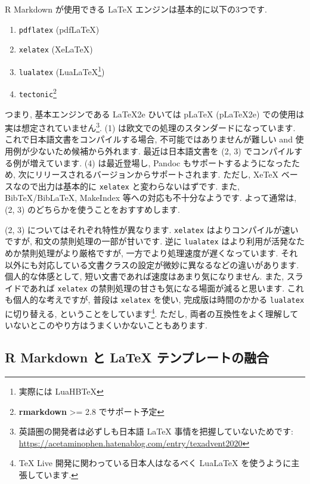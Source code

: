 \documentclass[
]{ltjsarticle}
\providecommand{\tightlist}{%
  \setlength{\itemsep}{0pt}\setlength{\parskip}{0pt}}
\begin{document}
R Markdown が使用できる LaTeX エンジンは基本的に以下の3つです.

\begin{enumerate}
\def\labelenumi{\arabic{enumi}.}
\tightlist
\item
  \texttt{pdflatex} (pdfLaTeX)
\item
  \texttt{xelatex} (XeLaTeX)
\item
  \texttt{lualatex} (LuaLaTeX\footnote{実際には LuaHBTeX})
\item
  \texttt{tectonic}\footnote{\textbf{rmarkdown} \textgreater= 2.8 でサポート予定}
\end{enumerate}

つまり, 基本エンジンである LaTeX2e ひいては pLaTeX (pLaTeX2e) での使用は実は想定されていません\footnote{英語圏の開発者は必ずしも日本語 LaTeX 事情を把握していないためです: \url{https://acetaminophen.hatenablog.com/entry/texadvent2020}}. (1) は欧文での処理のスタンダードになっています. これで日本語文書をコンパイルする場合, 不可能ではありませんが難しい and 使用例が少ないため候補から外れます. 最近は日本語文書を (2, 3) でコンパイルする例が増えています. (4) は最近登場し, Pandoc もサポートするようになったため, 次にリリースされるバージョンからサポートされます. ただし, XeTeX ベースなので出力は基本的に \texttt{xelatex} と変わらないはずです. また, BibTeX/BibLaTeX, MakeIndex 等への対応も不十分なようです. よって通常は, (2, 3) のどちらかを使うことをおすすめします.

(2, 3) についてはそれぞれ特性が異なります. \texttt{xelatex} はよりコンパイルが速いですが, 和文の禁則処理の一部が甘いです. 逆に \texttt{lualatex} はより利用が活発なためか禁則処理がより厳格ですが, 一方でより処理速度が遅くなっています. それ以外にも対応している文書クラスの設定が微妙に異なるなどの違いがあります. 個人的な体感として, 短い文書であれば速度はあまり気になりません. また, スライドであれば \texttt{xelatex} の禁則処理の甘さも気になる場面が減ると思います. これも個人的な考えですが, 普段は \texttt{xelatex} を使い, 完成版は時間のかかる \texttt{lualatex} に切り替える, ということをしています\footnote{TeX Live 開発に関わっている日本人はなるべく LuaLaTeX を使うように主張しています.}. ただし, 両者の互換性をよく理解していないとこのやり方はうまくいかないこともあります.

\hypertarget{r-markdown-ux3068-latex-ux30c6ux30f3ux30d7ux30ecux30fcux30c8ux306eux878dux5408}{%
\subsection{R Markdown と LaTeX テンプレートの融合}\label{r-markdown-ux3068-latex-ux30c6ux30f3ux30d7ux30ecux30fcux30c8ux306eux878dux5408}}
\end{document}

